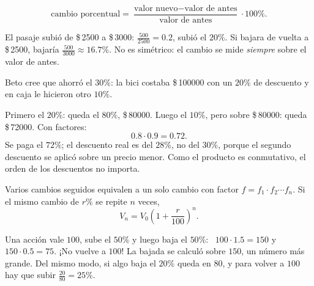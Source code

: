 \documentclass[11pt,a4paper]{article}
\let\nivelzuka\nivel
\renewcommand{\nivel}[2]{\Needspace{8\baselineskip}\nivelzuka{#1}{#2}}
\newcommand{\pesos}[1]{\$\,\num{#1}}
\begin{document}
\begin{propiedad}
\[ \text{cambio porcentual}=\frac{\text{valor nuevo}-\text{valor de antes}}{\text{valor de antes}}\cdot100\%. \]
\end{propiedad}
El pasaje subió de \pesos{2500} a \pesos{3000}: $\tfrac{500}{2500}=0.2$, subió el $20\%$. Si bajara de vuelta a
\pesos{2500}, bajaría $\tfrac{500}{3000}\approx16.7\%$. No es simétrico: el cambio se mide \emph{siempre} sobre el valor de antes.


Beto cree que ahorró el $30\%$: la bici costaba \pesos{100000} con un $20\%$ de descuento y en caja le hicieron otro $10\%$.

\begin{minipage}[c]{0.52\linewidth}
Primero el $20\%$: queda el $80\%$, \pesos{80000}. Luego el $10\%$, pero sobre \pesos{80000}: queda \pesos{72000}.
Con factores:
\[ 0.8\cdot0.9=0.72. \]
Se paga el $72\%$; el descuento real es del $28\%$, no del $30\%$, porque el segundo descuento se aplicó sobre un
precio menor. Como el producto es conmutativo, el orden de los descuentos no importa.
\end{minipage}\hfill
\begin{minipage}[c]{0.44\linewidth}\centering
{}
\end{minipage}

\begin{propiedad}
Varios cambios seguidos equivalen a un solo cambio con factor $f=f_1\cdot f_2\cdots f_n$. Si el mismo cambio de $r\%$
se repite $n$ veces,
\[ V_n=V_0\left(1+\frac{r}{100}\right)^{n}. \]
\end{propiedad}

\begin{ejemplo}
Una acción vale $100$, sube el $50\%$ y luego baja el $50\%$: \ $100\cdot1.5=150$ y $150\cdot0.5=75$. ¡No vuelve a $100$!
La bajada se calculó sobre $150$, un número más grande. Del mismo modo, si algo baja el $20\%$ queda en $80$, y para volver
a $100$ hay que subir $\tfrac{20}{80}=25\%$.
\end{ejemplo}
\end{document}
